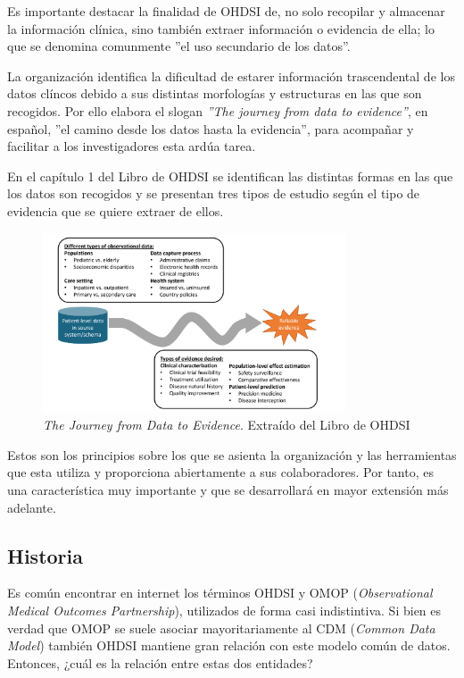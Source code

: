 Es importante destacar la finalidad de OHDSI de, no solo recopilar y almacenar la información clínica, sino también extraer información o evidencia de ella; lo que se denomina comunmente ''el uso secundario de los datos''. 

La organización identifica la dificultad de estarer información trascendental de los datos clíncos debido a sus distintas morfologías y estructuras en las que son recogidos. Por ello elabora el slogan \textit{''The journey from data to evidence''}, en español, ''el camino desde los datos hasta la evidencia'', para acompañar y facilitar a los investigadores esta ardúa tarea.

En el capítulo 1 del Libro de OHDSI se identifican las distintas formas en las que los datos son recogidos y se presentan tres tipos de estudio según el tipo de evidencia que se quiere extraer de ellos.

\begin{figure}[H]
    \centering
    \includegraphics[width=0.80\textwidth]{figures/journeyDataToEvidence.png}
     \caption{\textit{The Journey from Data to Evidence}. Extraído del Libro de OHDSI \cite{OHDSIbook}}
    \label{fig:journeyDataToEvidence}
\end{figure}

Estos son los principios sobre los que se asienta la organización y las herramientas que esta utiliza y proporciona abiertamente a sus colaboradores. Por tanto, es una característica muy importante y que se desarrollará en mayor extensión más adelante.    

\subsection{Historia}

Es común encontrar en internet los términos OHDSI y OMOP (\textit{Observational Medical Outcomes Partnership}), utilizados de forma casi indistintiva. Si bien es verdad que OMOP se suele asociar mayoritariamente al CDM (\textit{Common Data Model}) también OHDSI mantiene gran relación con este modelo común de datos. Entonces, ¿cuál es la relación entre estas dos entidades? 

